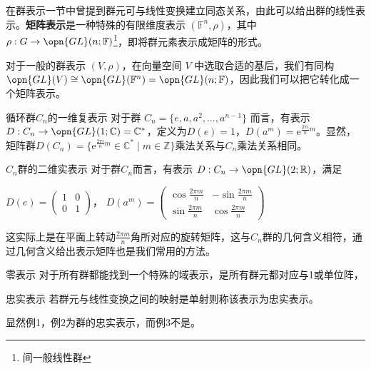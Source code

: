 

在群表示一节中曾提到群元可与线性变换建立同态关系，由此可以给出群的线性表示。\textbf{矩阵表示}是一种特殊的有限维度表示 $(\mathbb{F}^n, \rho)$，其中 $\rho: G \to \opn{GL}(n; \mathbb{F})$\footnote{间一般线性群}，即将群元素表示成矩阵的形式。

对于一般的群表示 $(V, \rho)$，在向量空间 $V$ 中选取合适的基后，我们有同构 $\opn{GL}(V) \cong \opn{GL}(\mathbb{F}^n) = \opn{GL}(n; \mathbb{F})$，因此我们可以把它转化成一个矩阵表示。

\begin{example}{循环群$C_n$的一维复表示}
对于群 $C_n = \{e, a, a^2, \dots, a^{n - 1}\}$ 而言，有表示 $D: C_n \to \opn{GL}(1; \mathbb{C}) = \mathbb{C}^*$，定义为$D(e)=1$，$D(a^m) = \mathrm{e}^{\frac{2\pi i}{n}m}$。显然，矩阵群$D(C_n) = \{\mathrm{e}^{\frac{2\pi i}{n}m} \in \mathbb{C}^* \mid m \in \mathbb{Z}\}$乘法关系与$C_n$乘法关系相同。
\label{gprep_ex1}
\end{example}

\begin{example}{$C_n$群的二维实表示}
对于群$C_n$而言，有表示 $D: C_n \to \opn{GL}(2; \mathbb{R})$，满足

$D(e)=\begin{pmatrix}
 1 & 0 \\
 0 & 1
\end{pmatrix}$，
$D(a^m)=\begin{pmatrix}
 \cos{\frac{2\pi m}{n}} & -\sin{\frac{2\pi m}{n}}\\
 \sin{\frac{2\pi m}{n}} &\cos{\frac{2\pi m}{n}}
\end{pmatrix}$

这实际上是在平面上转动$\frac{2\pi m}{n}$角所对应的旋转矩阵，这与$C_n$群的几何含义相符，通过几何含义给出表示矩阵也是我们常用的方法。
\end{example}

\begin{example}{零表示}\label{gprep_ex3}
对于所有群都能找到一个特殊的域$$表示，是所有群元都对应与1或单位阵，
\end{example}

\begin{definition}{忠实表示}
若群元与线性变换之间的映射是单射则称该表示为忠实表示。
\end{definition}

显然例1，例2为群的忠实表示，而例3不是。

